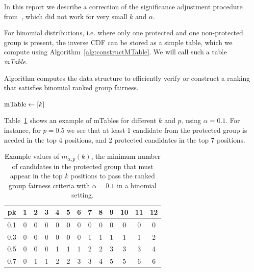 
In this report we describe a correction of the significance adjustment procedure from~\cite{zehlike2017fair}, which did not work for very small $k$ and $\alpha$.

For binomial distributions, i.e. where only one protected and one non-protected group is present, the inverse CDF can be stored as a simple table, which we compute using Algorithm~\ref{alg:constructMTable}.
%
We will call such a table \textit{mTable}.
%
\vspace{-2mm}
\begin{algorithm}[h]
	\caption{Algorithm \algoMtable computes the data structure to efficiently verify or construct a ranking that satisfies binomial ranked group fairness.}
	\label{alg:constructMTable}
	\small
	$\operatorname{mTable} \leftarrow [k]$ 
	\Return{$ \mtable $ }
\end{algorithm}
\vspace{-2mm}

Table~\ref{tbl:ranked_group_fairness_table} shows an example of mTables for different $ k $ and $ p $, using $\alpha=0.1$.
%
For instance, for $p=0.5$ we see that at least 1 candidate from the protected group is needed in the top 4 positions, and 2 protected candidates in the top 7 positions.
\begin{table}[ht!]
	\small\begin{tabular}{r|cccccccccccc}
		\diaghead{some text}%
		{p}{k}&
		1 & 2 & 3 & 4 & 5 & 6 & 7 & 8 & 9 & 10 & 11 & 12 \\ \midrule
		0.1      & 0 & 0 & 0 & 0 & 0 & 0 & 0 & 0 & 0 & 0  &  0 &  0 \\
		0.3      & 0 & 0 & 0 & 0 & 0 & 0 & 1 & 1 & 1 & 1  &  1 &  2 \\
		0.5      & 0 & 0 & 0 & 1 & 1 & 1 & 2 & 2 & 3 & 3  &  3 &  4 \\
		0.7      & 0 & 1 & 1 & 2 & 2 & 3 & 3 & 4 & 5 & 5  &  6 &  6 \\
		\bottomrule
	\end{tabular}
	\caption{Example values of $m_{\alpha,p}(k)$, the minimum number of candidates in the protected group that must appear in the top $k$ positions to pass the ranked group fairness criteria with $\alpha=0.1$ in a binomial setting.}
	\label{tbl:ranked_group_fairness_table}
\end{table}

